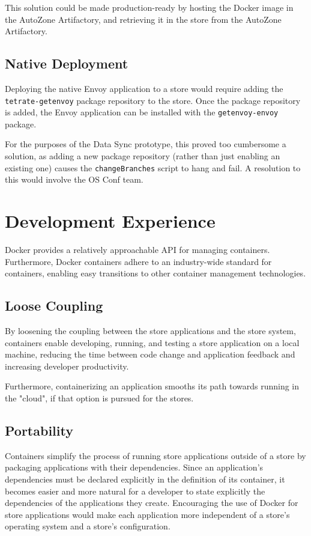 \documentclass{article}
\begin{document}
This solution could be made production-ready by hosting the Docker image in the AutoZone Artifactory, and retrieving it in the store from the AutoZone Artifactory.

\subsection{Native Deployment}
Deploying the native Envoy application to a store would require adding the \texttt{tetrate-getenvoy} package repository to the store. Once the package repository is added, the Envoy application can be installed with the \texttt{getenvoy-envoy} package.

For the purposes of the Data Sync prototype, this proved too cumbersome a solution, as adding a new package repository (rather than just enabling an existing one) causes the \texttt{changeBranches} script to hang and fail. A resolution to this would involve the OS Conf team.

\section{Development Experience}
Docker provides a relatively approachable API for managing containers. Furthermore, Docker containers adhere to an industry-wide standard for containers, enabling easy transitions to other container management technologies.

\subsection{Loose Coupling}
By loosening the coupling between the store applications and the store system, containers enable developing, running, and testing a store application on a local machine, reducing the time between code change and application feedback and increasing developer productivity.

Furthermore, containerizing an application smooths its path towards running in the "cloud", if that option is pursued for the stores.

\subsection{Portability}
Containers simplify the process of running store applications outside of a store by packaging applications with their dependencies. Since an application's dependencies must be declared explicitly in the definition of its container, it becomes easier and more natural for a developer to state explicitly the dependencies of the applications they create. Encouraging the use of Docker for store applications would make each application more independent of a store's operating system and a store's configuration.
\end{document}
